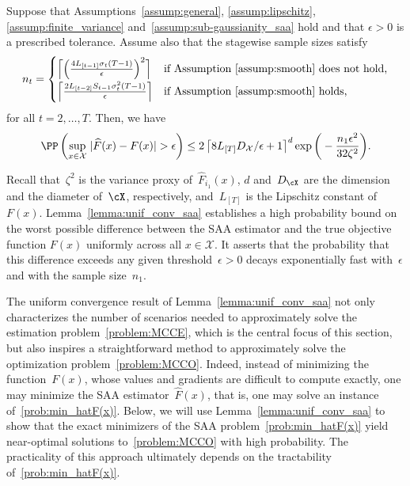 \documentclass[11pt]{article}
\let\hat\widehat
\begin{document}
\begin{lemma}\label{lemma:unif_conv_saa} Suppose that
 Assumptions~\ref{assump:general}, \ref{assump:lipschitz}, \ref{assump:finite_variance} and~\ref{assump:sub-gaussianity_saa} hold and that $\epsilon>0$ is a prescribed tolerance. Assume also that the stagewise sample sizes satisfy
\begin{align*}
    n_t = \begin{cases}
    \Big \lceil \Big( \frac{4L_{[t-1]}\sigma_{t} (T-1)}{\epsilon} \Big)^2 \Big \rceil&\text{if Assumption~\ref{assump:smooth} does not hold,} \\[1ex]
    \Big\lceil\frac{2L_{[t-2]}S_{t-1}\sigma_{t}^2 (T-1)}{\epsilon}\Big\rceil &\text{if Assumption~\ref{assump:smooth} holds,}
    \end{cases}
\end{align*}
for all $t=2,\ldots,T$. 
Then, we have
\begin{align*}
    \PP\left(\sup_{x\in \mathcal{X}} \; \lvert \hat{F}(x) - F(x) \rvert > \epsilon \right) \leq
    2\left\lceil 8L_{[T]} D_\mathcal{X}/\epsilon +1\right\rceil^{d} \exp\bigg(- \frac{n_1\epsilon^2}{32\zeta^2} \bigg).
    \end{align*}
\end{lemma}
Recall that~$\zeta^2$ is the variance proxy of~$\hat{F}_{i_1}(x)$, $d$ and~$D_\cX$ are the dimension and the diameter of~$\cX$, respectively, and~$L_{[T]}$ is the Lipschitz constant of~$F(x)$. Lemma~\ref{lemma:unif_conv_saa} establishes a high probability bound on the worst possible difference between the SAA estimator and the true objective function $F(x)$ uniformly across all $x\in\mathcal{X}$. It asserts that the probability that this difference exceeds any given threshold~$\epsilon>0$ decays exponentially fast with~$\epsilon$ and with the sample size~$n_1$. 

The uniform convergence result of Lemma~\ref{lemma:unif_conv_saa} not only characterizes the number of scenarios needed to approximately solve the estimation problem~\eqref{problem:MCCE}, which is the central focus of this section, but also inspires a straightforward method to approximately solve the optimization problem~\eqref{problem:MCCO}. Indeed, instead of minimizing the function~$F(x)$, whose values and gradients are difficult to compute exactly, one may minimize the SAA estimator~$\hat F(x)$, that is, one may solve an instance of~\eqref{prob:min_hatF(x)}. Below, we will use Lemma~\ref{lemma:unif_conv_saa} to show that the exact minimizers of the SAA problem~\eqref{prob:min_hatF(x)} yield near-optimal solutions to~\eqref{problem:MCCO} with high probability. The practicality of this approach ultimately depends on the tractability of~\eqref{prob:min_hatF(x)}.
\end{document}
